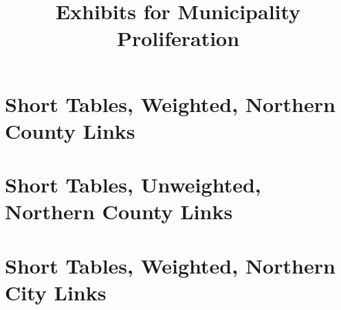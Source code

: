 \documentclass{article}
\title{Exhibits for Municipality Proliferation}
\begin{document}
\maketitle
\tableofcontents
{\footnotesize 
\listoffigures
\listoftables}
\clearpage

\section{Short Tables, Weighted, Northern County Links}






\clearpage
\section{Short Tables, Unweighted, Northern County Links}






\clearpage

\section{Short Tables, Weighted, Northern City Links}






\clearpage
\end{document}
